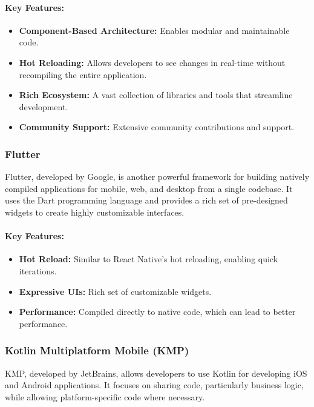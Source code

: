 \paragraph{Key Features:}

\begin{itemize}
    \item \textbf{Component-Based Architecture:} Enables modular and maintainable code.
    \item \textbf{Hot Reloading:} Allows developers to see changes in real-time without recompiling the entire application.
    \item \textbf{Rich Ecosystem:} A vast collection of libraries and tools that streamline development.
    \item \textbf{Community Support:} Extensive community contributions and support.
\end{itemize}

\subsubsection{Flutter}

Flutter, developed by Google, is another powerful framework for building natively compiled applications for mobile, web, and desktop from a single codebase. It uses the Dart programming language and provides a rich set of pre-designed widgets to create highly customizable interfaces\cite{Flutter}.

\paragraph{Key Features:}

\begin{itemize}
    \item \textbf{Hot Reload:} Similar to React Native's hot reloading, enabling quick iterations.
    \item \textbf{Expressive UIs:} Rich set of customizable widgets.
    \item \textbf{Performance:} Compiled directly to native code, which can lead to better performance.
\end{itemize}

\subsubsection{Kotlin Multiplatform Mobile (KMP)}

KMP, developed by JetBrains, allows developers to use Kotlin for developing iOS and Android applications. It focuses on sharing code, particularly business logic, while allowing platform-specific code where necessary\cite{KMP}.

